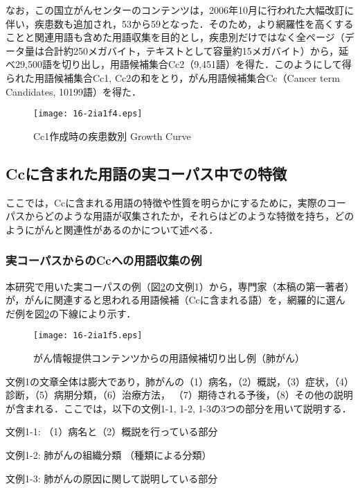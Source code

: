 \documentclass[japanese]{jnlp_1.4}
\begin{document}
なお，この国立がんセンターのコンテンツは，2006年10月に行われた大幅改訂に伴い，疾患数も追加され，53から59となった．そのため，より網羅性を高くすることと関連用語も含めた用語収集を目的とし，疾患別だけではなく全ページ（データ量は合計約250メガバイト，テキストとして容量約15メガバイト）から，延べ29,500語を切り出し，用語候補集合Cc2（9,451語）を得た．このようにして得られた用語候補集合Cc1, Cc2の和をとり，がん用語候補集合Cc（Cancer term Candidates, 10199語）を得た．

\begin{figure}[t]
 \begin{center}
  \texttt{[image: 16-2ia1f4.eps]}
 \end{center}
 \caption{Cc1作成時の疾患数別 Growth Curve}
 \label{f:004}
\end{figure}


\subsection{Ccに含まれた用語の実コーパス中での特徴}
\label{s:Ccに含まれた用語の実コーパス中での特徴}

ここでは，Ccに含まれる用語の特徴や性質を明らかにするために，実際のコーパスからどのような用語が収集されたか，それらはどのような特徴を持ち，どのようにがんと関連性があるのかについて述べる．

\subsubsection{実コーパスからのCcへの用語収集の例}
\label{s:実コーパスからのCcへの用語収集の例}

本研究で用いた実コーパスの例（図\ref{f:005}の文例1）から，専門家（本稿の第一著者）が，がんに関連すると思われる用語候補（Ccに含まれる語）を，網羅的に選んだ例を図\ref{f:005}の下線により示す．

\begin{figure}[p]
 \begin{center}
  \texttt{[image: 16-2ia1f5.eps]}
 \end{center}
 \caption{がん情報提供コンテンツからの用語候補切り出し例（肺がん）}
 \label{f:005}
\end{figure}

文例1の文章全体は膨大であり，肺がんの（1）病名，（2）概説，（3）症状，（4）診断，（5）病期分類，（6）治療方法， （7）期待される予後，（8）その他の説明が含まれる．ここでは，以下の文例1-1, 1-2, 1-3の3つの部分を用いて説明する．

文例1-1: （1）病名と（2）概説を行っている部分 \par
文例1-2: 肺がんの組織分類 （種類による分類）\par
文例1-3: 肺がんの原因に関して説明している部分
\end{document}
